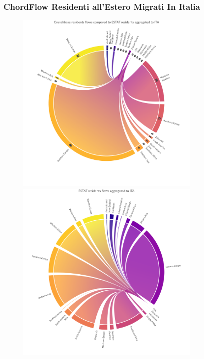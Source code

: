 \subsubsection{ChordFlow Residenti all'Estero Migrati In Italia}
\begin{figure}[H]
    \centering
    \includegraphics[width=0.8\textwidth]{images/ChordFlows/filtered_destination/ita/Crunchbase_res_ESTAT_True.png}
    \includegraphics[width=0.8\textwidth]{images/ChordFlows/filtered_destination/ita/ESTAT_res_True.png}
    \label{fig:chordtoita_res_true}
\end{figure}

